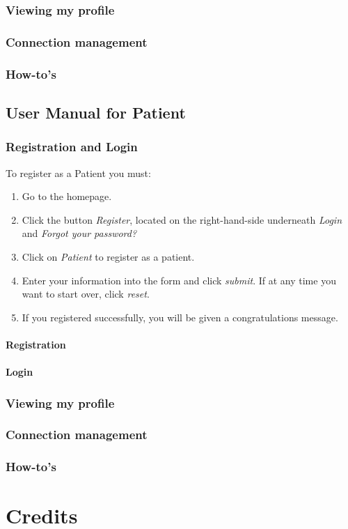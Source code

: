 \documentclass[12pt]{report}
\begin{document}
\section{Viewing my profile}
\section{Connection management}
\section{How-to's}

\chapter{User Manual for Patient}
\section{Registration and Login}
To register as a Patient you must:
\begin{enumerate}
\item Go to the homepage.
\item Click the button \textit{Register}, located on the right-hand-side underneath \textit{Login} and \textit{Forgot your password?}
\item Click on \textit{Patient} to register as a patient.
\item Enter your information into the form and click \textit{submit}. If at any time you want to start over, click \textit{reset}.
\item If you registered successfully, you will be given a congratulations message.
\end{enumerate}
\subsection{Registration}
\subsection{Login}
\section{Viewing my profile}
\section{Connection management}
\section{How-to's}

\part{Credits}
\end{document}
